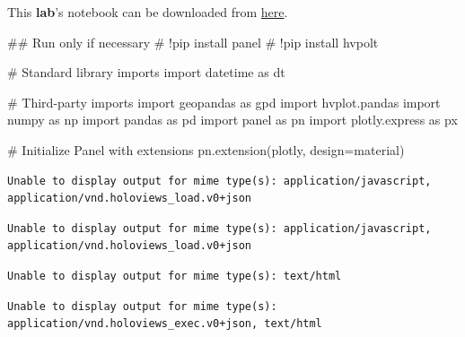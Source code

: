 \documentclass[
  letterpaper,
  DIV=11,
  numbers=noendperiod]{scrreprt}
\newenvironment{Shaded}{\begin{snugshade}}{\end{snugshade}}
\newcommand{\CommentTok}[1]{\textcolor[rgb]{0.37,0.37,0.37}{#1}}
\newcommand{\ImportTok}[1]{\textcolor[rgb]{0.00,0.46,0.62}{#1}}
\newcommand{\NormalTok}[1]{\textcolor[rgb]{0.00,0.23,0.31}{#1}}
\newcommand{\OperatorTok}[1]{\textcolor[rgb]{0.37,0.37,0.37}{#1}}
\newcommand{\StringTok}[1]{\textcolor[rgb]{0.13,0.47,0.30}{#1}}
\begin{document}
This \textbf{lab}'s notebook can be downloaded from
\href{https://github.com/GDSL-UL/wma/blob/main/labs/w08_dashboards.ipynb}{here}.

\begin{Shaded}
\begin{Highlighting}[]
\CommentTok{\#\# Run only if necessary}
\CommentTok{\# !pip install panel}
\CommentTok{\# !pip install hvpolt}
\end{Highlighting}
\end{Shaded}

\begin{Shaded}
\begin{Highlighting}[]
\CommentTok{\# Standard library imports}
\ImportTok{import}\NormalTok{ datetime }\ImportTok{as}\NormalTok{ dt}

\CommentTok{\# Third{-}party imports}
\ImportTok{import}\NormalTok{ geopandas }\ImportTok{as}\NormalTok{ gpd}
\ImportTok{import}\NormalTok{ hvplot.pandas}
\ImportTok{import}\NormalTok{ numpy }\ImportTok{as}\NormalTok{ np}
\ImportTok{import}\NormalTok{ pandas }\ImportTok{as}\NormalTok{ pd}
\ImportTok{import}\NormalTok{ panel }\ImportTok{as}\NormalTok{ pn}
\ImportTok{import}\NormalTok{ plotly.express }\ImportTok{as}\NormalTok{ px}

\CommentTok{\# Initialize Panel with extensions}
\NormalTok{pn.extension(}\StringTok{\textquotesingle{}plotly\textquotesingle{}}\NormalTok{, design}\OperatorTok{=}\StringTok{\textquotesingle{}material\textquotesingle{}}\NormalTok{)}
\end{Highlighting}
\end{Shaded}

\begin{verbatim}
Unable to display output for mime type(s): application/javascript, application/vnd.holoviews_load.v0+json
\end{verbatim}

\begin{verbatim}
Unable to display output for mime type(s): application/javascript, application/vnd.holoviews_load.v0+json
\end{verbatim}

\begin{verbatim}
Unable to display output for mime type(s): text/html
\end{verbatim}

\begin{verbatim}
Unable to display output for mime type(s): application/vnd.holoviews_exec.v0+json, text/html
\end{verbatim}
\end{document}
